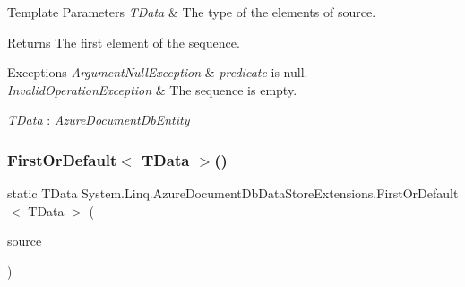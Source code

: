 \begin{DoxyTemplParams}{Template Parameters}
{\em T\+Data} & The type of the elements of source.\\
\hline
\end{DoxyTemplParams}
\begin{DoxyReturn}{Returns}
The first element of the sequence.
\end{DoxyReturn}

\begin{DoxyExceptions}{Exceptions}
{\em Argument\+Null\+Exception} & {\itshape predicate}  is null.\\
\hline
{\em Invalid\+Operation\+Exception} & The sequence is empty.\\
\hline
\end{DoxyExceptions}
\begin{Desc}
\item[Type Constraints]\begin{description}
\item[{\em T\+Data} : {\em Azure\+Document\+Db\+Entity}]\end{description}
\end{Desc}
\mbox{\label{classSystem_1_1Linq_1_1AzureDocumentDbDataStoreExtensions_a5508e54e8c57884a4d220f6943dd356d}} 
\subsubsection{\texorpdfstring{First\+Or\+Default$<$ T\+Data $>$()}{FirstOrDefault< TData >()}\hspace{0.1cm}{\footnotesize\ttfamily [1/2]}}
{\footnotesize\ttfamily static T\+Data System.\+Linq.\+Azure\+Document\+Db\+Data\+Store\+Extensions.\+First\+Or\+Default$<$ T\+Data $>$ (\begin{DoxyParamCaption}\item[{this \hyperlink{classCqrs_1_1Azure_1_1DocumentDb_1_1DataStores_1_1AzureDocumentDbDataStore}{Azure\+Document\+Db\+Data\+Store}$<$ T\+Data $>$}]{source }\end{DoxyParamCaption})\hspace{0.3cm}{\ttfamily [static]}}



